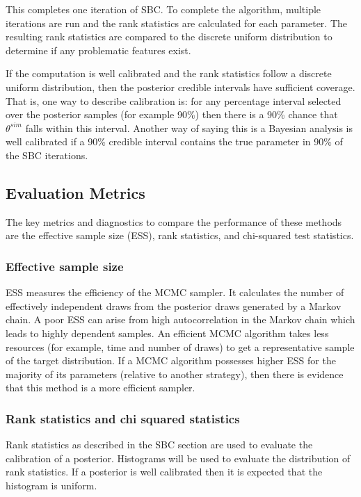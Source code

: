 \documentclass[12pt, a4paper]{article}
\begin{document}
        This completes one iteration of SBC. To complete the algorithm, multiple iterations are run and the rank statistics are calculated for each parameter. The resulting rank statistics are compared to the discrete uniform distribution to determine if any problematic features exist.

        If the computation is well calibrated and the rank statistics follow a discrete uniform distribution, then the posterior credible intervals have sufficient coverage. That is, one way to describe calibration is: for any percentage interval selected over the posterior samples (for example 90\%) then there is a 90\% chance that $\theta^{sim}$ falls within this interval. Another way of saying this is a Bayesian analysis is well calibrated if a 90\% credible interval contains the true parameter in 90\% of the SBC iterations. 

    \subsection{Evaluation Metrics}
        The key metrics and diagnostics to compare the performance of these methods are the effective sample size (ESS), rank statistics, and chi-squared test statistics. 
        
        \subsubsection{Effective sample size}
            ESS measures the efficiency of the MCMC sampler. It calculates the number of effectively independent draws from the posterior draws generated by a Markov chain. A poor ESS can arise from high autocorrelation in the Markov chain which leads to highly dependent samples. An efficient MCMC algorithm takes less resources (for example, time and number of draws) to get a representative sample of the target distribution. If a MCMC algorithm possesses higher ESS for the majority of its parameters (relative to another strategy), then there is evidence that this method is a more efficient sampler. 
    
        \subsubsection{Rank statistics and chi squared statistics}
            Rank statistics as described in the SBC section are used to evaluate the calibration of a posterior. Histograms will be used to evaluate the distribution of rank statistics. If a posterior is well calibrated then it is expected that the histogram is uniform.
    
\end{document}
